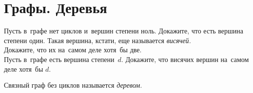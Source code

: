 
\section*{Графы. Деревья}


\begin{problems}

\item
\subproblem
Пусть в~графе нет циклов и~вершин степени ноль.
Докажите, что есть вершина степени один.
Такая вершина, кстати, еще называется \emph{висячей.}
\\
\subproblem
Докажите, что их на~самом деле хотя~бы две.
\\
\subproblem
Пусть в~графе есть вершина степени~$d$.
Докажите, что висячих вершин на~самом деле хотя~бы $d$.

\end{problems}

Связный граф без циклов называется \emph{деревом.}

